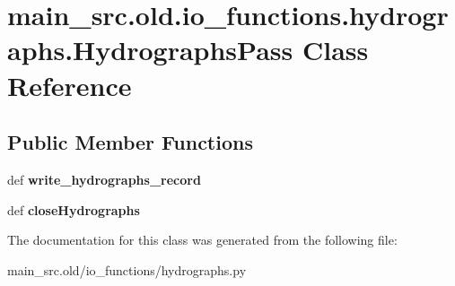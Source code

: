 \hypertarget{classmain__src_8old_1_1io__functions_1_1hydrographs_1_1HydrographsPass}{\section{main\-\_\-src.\-old.\-io\-\_\-functions.\-hydrographs.\-Hydrographs\-Pass Class Reference}
\label{classmain__src_8old_1_1io__functions_1_1hydrographs_1_1HydrographsPass}
}
\subsection*{Public Member Functions}
\begin{DoxyCompactItemize}
\item 
\hypertarget{classmain__src_8old_1_1io__functions_1_1hydrographs_1_1HydrographsPass_a1b766ff581ef13fb038574c2dfad679a}{def {\bfseries write\-\_\-hydrographs\-\_\-record}}\label{classmain__src_8old_1_1io__functions_1_1hydrographs_1_1HydrographsPass_a1b766ff581ef13fb038574c2dfad679a}

\item 
\hypertarget{classmain__src_8old_1_1io__functions_1_1hydrographs_1_1HydrographsPass_a27fd13d9da5b0e4d5cf4f23ce3ae1111}{def {\bfseries close\-Hydrographs}}\label{classmain__src_8old_1_1io__functions_1_1hydrographs_1_1HydrographsPass_a27fd13d9da5b0e4d5cf4f23ce3ae1111}

\end{DoxyCompactItemize}


The documentation for this class was generated from the following file\-:\begin{DoxyCompactItemize}
\item 
main\-\_\-src.\-old/io\-\_\-functions/hydrographs.\-py\end{DoxyCompactItemize}
